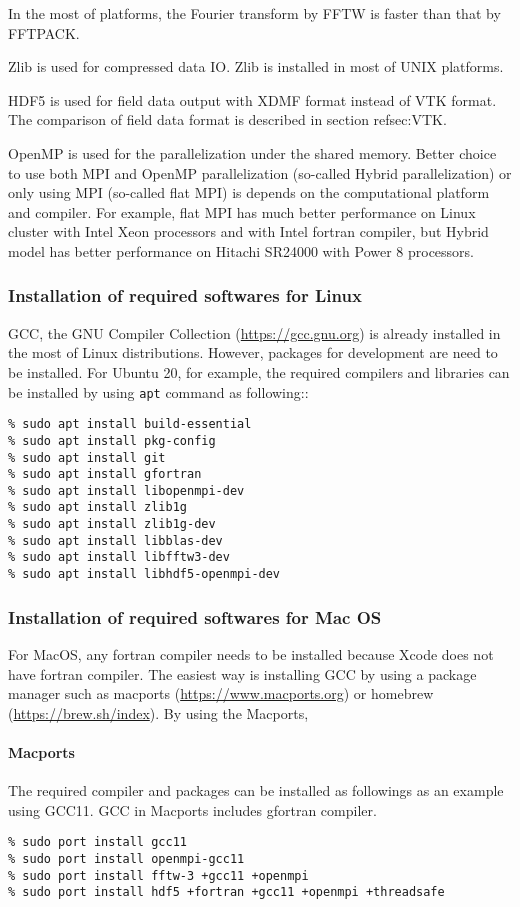 In the most of platforms, the Fourier transform by FFTW is faster than that by FFTPACK. 

Zlib is used for compressed data IO. Zlib is installed in most of UNIX platforms.

HDF5 is used for field data output with XDMF format instead of VTK format. The comparison of field data format is described in section ref{sec:VTK}. 

OpenMP is used for the parallelization under the shared memory. Better choice to use both MPI and OpenMP parallelization (so-called Hybrid parallelization) or only using MPI (so-called flat MPI) is depends on the computational platform and compiler. For example, flat MPI has much better performance on Linux cluster with Intel Xeon processors and with Intel fortran compiler, but Hybrid model has better performance on Hitachi SR24000 with Power 8 processors.

\subsubsection{Installation of required softwares for Linux}
GCC, the GNU Compiler Collection (\url{https://gcc.gnu.org}) is already installed in the most of Linux distributions. However, packages for development are need to be installed. For Ubuntu 20, for example, the required compilers and  libraries can be installed by using \verb|apt| command as following::
%
\begin{verbatim}
% sudo apt install build-essential
% sudo apt install pkg-config
% sudo apt install git
% sudo apt install gfortran
% sudo apt install libopenmpi-dev
% sudo apt install zlib1g
% sudo apt install zlib1g-dev
% sudo apt install libblas-dev
% sudo apt install libfftw3-dev
% sudo apt install libhdf5-openmpi-dev
\end{verbatim}

 
\subsubsection{Installation of required softwares for Mac OS}
For MacOS, any fortran compiler needs to be installed because Xcode does not have fortran compiler. The easiest way is installing GCC by using a package manager such as macports (\url{https://www.macports.org}) or homebrew (\url{https://brew.sh/index}). By using the Macports, 

\paragraph{Macports}
The required compiler and packages can be installed as followings as an example using GCC11. GCC in Macports includes gfortran compiler.
%
\begin{verbatim}
% sudo port install gcc11
% sudo port install openmpi-gcc11
% sudo port install fftw-3 +gcc11 +openmpi
% sudo port install hdf5 +fortran +gcc11 +openmpi +threadsafe
\end{verbatim}

